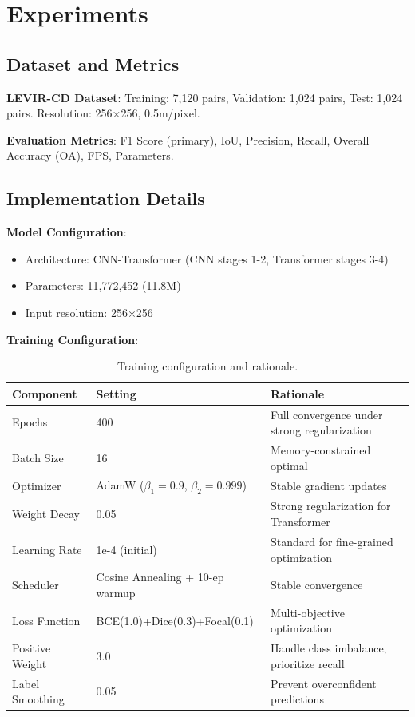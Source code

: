 \documentclass[journal]{IEEEtran}
\begin{document}
\section{Experiments}

\subsection{Dataset and Metrics}

\textbf{LEVIR-CD Dataset}: Training: 7,120 pairs, Validation: 1,024 pairs, Test: 1,024 pairs. Resolution: 256×256, 0.5m/pixel.

\textbf{Evaluation Metrics}: F1 Score (primary), IoU, Precision, Recall, Overall Accuracy (OA), FPS, Parameters.

\subsection{Implementation Details}

\textbf{Model Configuration}:
\begin{itemize}
\item Architecture: CNN-Transformer (CNN stages 1-2, Transformer stages 3-4)
\item Parameters: 11,772,452 (11.8M)
\item Input resolution: 256×256
\end{itemize}

\textbf{Training Configuration}:

\begin{table}[H]
\centering
\caption{Training configuration and rationale.}
\begin{tabular}{lll}
\toprule
\textbf{Component} & \textbf{Setting} & \textbf{Rationale} \\
\midrule
Epochs & 400 & Full convergence under strong regularization \\
Batch Size & 16 & Memory-constrained optimal \\
Optimizer & AdamW ($\beta_1=0.9$, $\beta_2=0.999$) & Stable gradient updates \\
Weight Decay & 0.05 & Strong regularization for Transformer \\
Learning Rate & 1e-4 (initial) & Standard for fine-grained optimization \\
Scheduler & Cosine Annealing + 10-ep warmup & Stable convergence \\
Loss Function & BCE(1.0)+Dice(0.3)+Focal(0.1) & Multi-objective optimization \\
Positive Weight & 3.0 & Handle class imbalance, prioritize recall \\
Label Smoothing & 0.05 & Prevent overconfident predictions \\
\bottomrule
\end{tabular}
\end{table}
\end{document}
